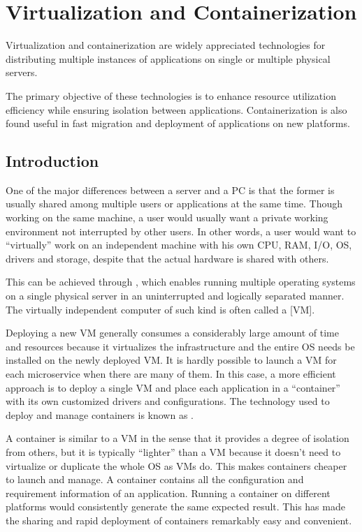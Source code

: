 \chapter{Virtualization and Containerization} \label{ch:vac}

Virtualization and containerization are widely appreciated technologies for distributing multiple instances of applications on single or multiple physical servers. 

The primary objective of these technologies is to enhance resource utilization efficiency while ensuring isolation between applications. Containerization is also found useful in fast migration and deployment of applications on new platforms.

\section{Introduction}

One of the major differences between a server and a PC is that the former is usually shared among multiple users or applications at the same time. Though working on the same machine, a user would usually want a private working environment not interrupted by other users. In other words, a user would want to ``virtually'' work on an independent machine with his own CPU, RAM, I/O, OS, drivers and storage, despite that the actual hardware is shared with others. 

This can be achieved through , which enables running multiple operating systems on a single physical server in an uninterrupted and logically separated manner. The virtually independent computer of such kind is often called a [VM].

Deploying a new VM generally consumes a considerably large amount of time and resources because it virtualizes the infrastructure and the entire OS needs be installed on the newly deployed VM. It is hardly possible to launch a VM for each microservice when there are many of them. In this case, a more efficient approach is to deploy a single VM and place each application in a ``container'' with its own customized drivers and configurations. The technology used to deploy and manage containers is known as .

A container is similar to a VM in the sense that it provides a degree of isolation from others, but it is typically ``lighter'' than a VM because it doesn't need to virtualize or duplicate the whole OS as VMs do. This makes containers cheaper to launch and manage. A container contains all the configuration and requirement information of an application. Running a container on different platforms would consistently generate the same expected result. This has made the sharing and rapid deployment of containers remarkably easy and convenient. 

